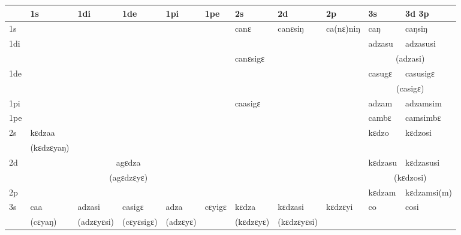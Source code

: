 \documentclass[oldfontcommands,twoside,a4paper,12pt]{memoir}
\newcommand{\ipab}[1]{{\scriptsize\phon #1}}
\begin{document}
\begin{landscape}
\begin{table}[t]
\begin{tabular}{l|l|l|l|l|l|l|l|l|l|l}  \toprule
&1s & 1di & 1de & 1pi & 1pe & 2s &2d & 2p & 3s & 3d  3p   \\ 
\midrule
1s  & \multicolumn{5}{c}{\cellcolor{lightgray}} & \ipab{canɛ} & \ipab{canɛsiŋ} & \ipab{ca(nɛ)niŋ} & \ipab{caŋ} & \ipab{caŋsiŋ} \\ 
\cline{7-11}1di  & \multicolumn{5}{c}{\cellcolor{lightgray}} & \multicolumn{2}{c}{} && \ipab{adzasu} & \ipab{adzasusi} \\ 
&\multicolumn{5}{c}{\cellcolor{lightgray}}  & \multicolumn{2}{l}{\ipab{canɛsigɛ}}   && \multicolumn{2}{c}{(\ipab{adzasi})} \\ 
1de	& \multicolumn{5}{c}{\cellcolor{lightgray}} & \multicolumn{2}{c}{} && \ipab{casugɛ} & \ipab{casusigɛ} \\ 
&\multicolumn{5}{c}{\cellcolor{lightgray}}  & \multicolumn{2}{c}{}   && \multicolumn{2}{c}{(\ipab{casigɛ})} \\ 
\cline{7-11}1pi	& \multicolumn{5}{c}{\cellcolor{lightgray}} & \multicolumn{2}{l}{\ipab{caasigɛ}} &&  \ipab{adzam} & \ipab{adzamsim} \\ 
1pe	& \multicolumn{5}{c}{\cellcolor{lightgray}} & \multicolumn{2}{c}{} && \ipab{cambɛ} & \ipab{camsimbɛ} \\ 
\cline{10-11}2s & \ipab{kɛdzaa}  &\multicolumn{4}{c}{}&\multicolumn{3}{c}{\cellcolor{lightgray}} & \ipab{kɛdzo} & \ipab{kɛdzosi} \\ 
& \ipab{(kɛdzɛyaŋ}) 	&\multicolumn{4}{c}{}&\multicolumn{3}{c}{\cellcolor{lightgray}}	&\\ 
\cline{2-2} 2d &\multicolumn{5}{c}{\ipab{agɛdza}}  &\multicolumn{3}{c}{\cellcolor{lightgray}} & \ipab{kɛdzasu} & \ipab{kɛdzasusi} \\ 
& \multicolumn{5}{c}{\ipab{(agɛdzɛyɛ})} &\multicolumn{3}{c}{\cellcolor{lightgray}} & \multicolumn{2}{c}{(\ipab{kɛdzosi})} 	\\ 
2p &\multicolumn{5}{c}{}  &\multicolumn{3}{c}{\cellcolor{lightgray}} & \ipab{kɛdzam} & \ipab{kɛdzamsi(m)} \\ 
\cline{2-6} \cline{10-11}3s & \ipab{caa} & \ipab{adzasi}   & \ipab{casigɛ}  & \ipab{adza} & \ipab{cɛyigɛ} & \ipab{kɛdza} & \ipab{kɛdzasi} & \ipab{kɛdzɛyi} & \ipab{co} & \ipab{cosi} \\ 
 & (\ipab{cɛyaŋ}) & (\ipab{adzɛyɛsi})   & (\ipab{cɛyɛsigɛ})  & (\ipab{adzɛyɛ}) &   & (\ipab{kɛdzɛyɛ}) & (\ipab{kɛdzɛyɛsi}) &  & &  \\ 

\end{tabular}
\end{table}
\end{landscape}
\end{document}
